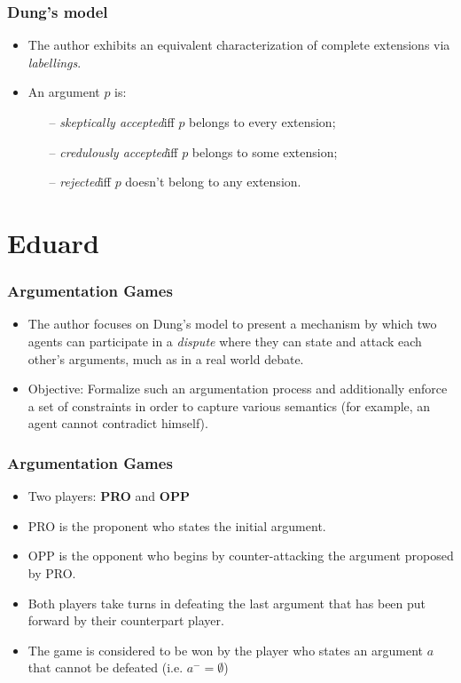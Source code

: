 \documentclass{beamer}
\begin{document}
\begin{frame}
\frametitle{Dung's model}
\begin{itemize}
\item The author exhibits an equivalent characterization of complete extensions via \emph{labellings}. \pause
\item An argument $p$ is:
  \begin{itemize}
  \item[--] \emph{skeptically accepted}\quad iff $p$ belongs to every extension;
  \item[--] \emph{credulously accepted}\quad iff $p$ belongs to some extension;
  \item[--] \emph{rejected}\quad iff $p$ doesn't belong to any extension.
  \end{itemize}
\end{itemize}
\end{frame}

\section{Eduard}
\begin{frame}
	\frametitle{Argumentation Games}
	\begin{itemize}
		\item The author focuses on Dung's model to present a mechanism by which two agents can participate in a \emph{dispute} where they can state and attack each other's arguments, much as in a real world debate. \pause

		\item Objective: Formalize such an argumentation process and additionally enforce a set of constraints in order to capture various semantics (for example, an agent cannot contradict himself).
	\end{itemize}
\end{frame}

\begin{frame}
	\frametitle{Argumentation Games}
	\begin{itemize}
		\item Two players: \textbf{PRO} and \textbf{OPP} \pause

		\item PRO is the proponent who states the initial argument. \pause
		\item OPP is the opponent who begins by counter-attacking the argument proposed by PRO.\pause
		\item Both players take turns in defeating the last argument that has been put forward by their counterpart player.\pause
		\item The game is considered to be won by the player who states an argument $a$ that cannot be defeated (i.e. $a^{-} = \emptyset$)
	\end{itemize}
\end{frame}
\end{document}
